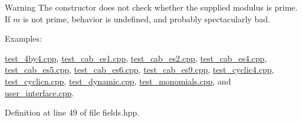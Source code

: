 \begin{DoxyWarning}{Warning}
The constructor does not check whether the supplied modulus is prime. If $m$ is not prime, behavior is undefined, and probably spectacularly bad. 
\end{DoxyWarning}
\begin{Desc}
\item[Examples\+: ]\par
\hyperlink{test_4by4_8cpp-example}{test\+\_\+4by4.\+cpp}, \hyperlink{test_cab_es1_8cpp-example}{test\+\_\+cab\+\_\+es1.\+cpp}, \hyperlink{test_cab_es2_8cpp-example}{test\+\_\+cab\+\_\+es2.\+cpp}, \hyperlink{test_cab_es4_8cpp-example}{test\+\_\+cab\+\_\+es4.\+cpp}, \hyperlink{test_cab_es5_8cpp-example}{test\+\_\+cab\+\_\+es5.\+cpp}, \hyperlink{test_cab_es6_8cpp-example}{test\+\_\+cab\+\_\+es6.\+cpp}, \hyperlink{test_cab_es9_8cpp-example}{test\+\_\+cab\+\_\+es9.\+cpp}, \hyperlink{test_cyclic4_8cpp-example}{test\+\_\+cyclic4.\+cpp}, \hyperlink{test_cyclicn_8cpp-example}{test\+\_\+cyclicn.\+cpp}, \hyperlink{test_dynamic_8cpp-example}{test\+\_\+dynamic.\+cpp}, \hyperlink{test_monomials_8cpp-example}{test\+\_\+monomials.\+cpp}, and \hyperlink{user_interface_8cpp-example}{user\+\_\+interface.\+cpp}.\end{Desc}


Definition at line 49 of file fields.\+hpp.


